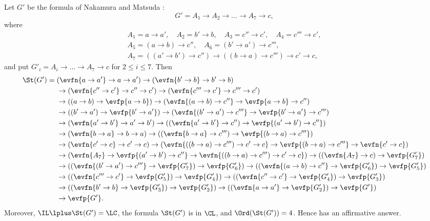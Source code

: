 \begin{corollary}\label{cor:LC}
Let $G'$ be the formula of Nakamura and Matsuda \cite[Sect.~4]{NM21}:
\[
G'=A_1\to A_2\to\dots\to A_7\to c ,
\]
where
\begin{gather*}
A_1=a\to a',\quad A_2=b'\to b,\quad A_3=c''\to c',\quad A_4=c'''\to c',\\
A_5=(a\to b)\to c'',\quad A_6=(b'\to a')\to c''',\\
A_7=((a'\to b')\to c'')\to((b\to a)\to c''')\to c'\to c ,
\end{gather*}
and put $G'_i=A_i\to\dots\to A_7\to c$ for $2\le i\le7$. Then
\begin{equation}\label{eq:SGprime}
\begin{aligned}
\St(G')={}&(\evfn{a\to a'}\to a\to a')\to (\evfn{b'\to b}\to b'\to b)\\
&\to (\evfn{c''\to c'}\to c''\to c')\to (\evfn{c'''\to c'}\to c'''\to c')\\
&\to ((a\to b)\to \evfp{a\to b})\to (\evfn{(a\to b)\to c''}\to \evfp{a\to b}\to c'')\\
&\to ((b'\to a')\to \evfp{b'\to a'})\to (\evfn{(b'\to a')\to c'''}\to \evfp{b'\to a'}\to c''')\\
&\to (\evfn{a'\to b'}\to a'\to b')\to ((\evfn{a'\to b'}\to c'')\to \evfp{(a'\to b')\to c''})\\
&\to (\evfn{b\to a}\to b\to a)\to ((\evfn{b\to a}\to c''')\to \evfp{(b\to a)\to c'''})\\
&\to (\evfn{c'\to c}\to c'\to c)\to (\evfn{((b\to a)\to c''')\to c'\to c}\to \evfp{(b\to a)\to c'''}\to \evfn{c'\to c})\\
&\to (\evfn{A_7}\to \evfp{(a'\to b')\to c''}\to \evfn{((b\to a)\to c''')\to c'\to c})\to ((\evfn{A_7}\to c)\to \evfp{G'_{7}})\\
&\to ((\evfn{(b'\to a')\to c'''}\to \evfp{G'_{7}})\to \evfp{G'_{6}})\to ((\evfn{(a\to b)\to c''}\to \evfp{G'_{6}})\to \evfp{G'_{5}})\\
&\to ((\evfn{c'''\to c'}\to \evfp{G'_{5}})\to \evfp{G'_{4}})\to ((\evfn{c''\to c'}\to \evfp{G'_{4}})\to \evfp{G'_{3}})\\
&\to ((\evfn{b'\to b}\to \evfp{G'_{3}})\to \evfp{G'_{2}})\to ((\evfn{a\to a'}\to \evfp{G'_{2}})\to \evfp{G'})\\
&\to \evfp{G'}.
\end{aligned}
\end{equation}
Moreover, $\IL\lplus\St(G')=\LC$, the formula $\St(G')$ is  in
$\CL$, and $\Ord(\St(G'))=4$. Hence \cite[Open Problem~2]{NM21} has an
affirmative answer.
\end{corollary}

